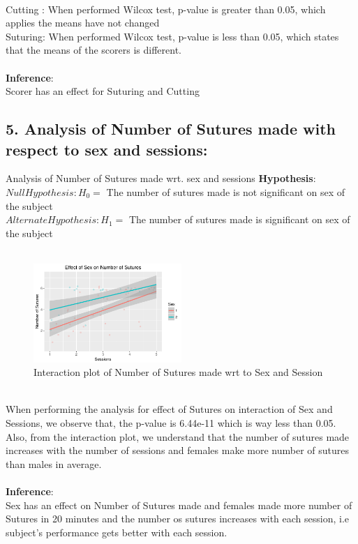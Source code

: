 \documentclass[12pt,epsf]{report}
\begin{document}
\\
Cutting : When performed Wilcox test, p-value is greater than 0.05, which applies the means have not changed\\
Suturing: When performed Wilcox test, p-value is less than 0.05, which states that the means of the scorers is different. \\
\\
\textbf{Inference}:\\
Scorer has an effect for Suturing and Cutting\\
\FloatBarrier
\subsection*{5. Analysis of Number of Sutures made with respect to sex and sessions:}
 {Analysis of Number of Sutures made wrt. sex and sessions}
\textbf{Hypothesis}:\\
$Null Hypothesis : H_0 = $ The number of sutures made is not significant on sex of the subject\\
$Alternate Hypothesis : H_1 = $ The number of sutures made is  significant on sex of the subject\\
\\
\begin{figure}[!htb]
	\centering
	\includegraphics[width=0.5\textwidth]{SuturingVsSex.pdf}
	\caption{Interaction plot of Number of Sutures made wrt to Sex and Session}
	\centering
\end{figure}
\\
When performing the analysis for effect of Sutures on interaction of Sex and Sessions, we observe that, the p-value is 6.44e-11 which is way less than 0.05.\\
Also, from the interaction plot, we understand that the number of sutures made increases with the number of sessions and females make more number of sutures than males in average.\\
\\
\textbf{Inference}:\\
Sex has an effect on Number of Sutures made and females made more number of Sutures in 20 minutes and the number os sutures increases with each session, i.e subject's performance gets better with each session.\\
\FloatBarrier
\end{document}
